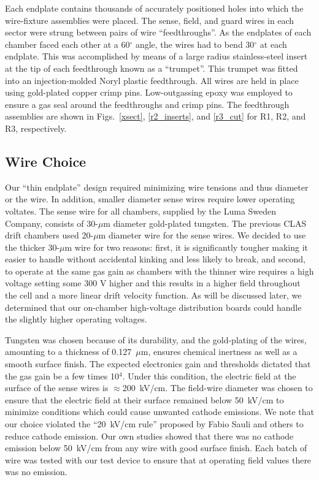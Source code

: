 Each endplate contains thousands of accurately positioned holes into which the 
wire-fixture assemblies were placed.  The sense, field, and guard wires in each 
sector were strung between pairs of wire ``feedthroughs''.  As the endplates of 
each chamber faced each other at a 60$^{\circ}$ angle, the wires had to bend 
30$^{\circ}$ at each endplate.  This was accomplished by means of a large radius 
stainless-steel insert at the tip of each feedthrough known as a ``trumpet''.
This trumpet was fitted into an injection-molded Noryl plastic feedthrough.  
All wires are held in place using gold-plated copper crimp pins.  
Low-outgassing epoxy was employed to 
ensure a gas seal around the feedthroughs and crimp pins.  The feedthrough assemblies
are shown in Figs.~\ref{xsect}, \ref{r2_inserts}, and \ref{r3_cut} for R1, R2, 
and R3, respectively.

\subsection{Wire Choice}
\hskip 0.15in

Our ``thin endplate'' design required minimizing wire tensions and
thus diameter or the wire.  In addition, smaller diameter sense wires
require lower operating voltates.
The sense wire for all chambers, supplied by the Luma
Sweden Company, consists of 30-$\mu$m diameter gold-plated tungsten.  
The previous CLAS drift chambers used 20-$\mu$m diameter wire for the
sense wires.  We decided to use the thicker 30-$\mu$m wire for two 
reasons: first, it is significantly tougher making it easier to handle without
accidental kinking and less likely to break, and second, to operate at the same 
gas gain as chambers with the thinner wire requires a high voltage setting 
some 300 V higher and this results in a higher field throughout the cell
and a more linear drift velocity function.  As will be discussed later,
we determined that our on-chamber high-voltage distribution boards could
handle the slightly higher operating voltages.

Tungsten was chosen because of its durability, 
and the gold-plating of the wires, amounting to a thickness of 0.127~$\mu$m, 
ensures chemical inertness as well as a smooth surface finish.  The expected 
electronics gain and thresholds dictated that the gas gain be a few times 
10$^4$.  Under this condition, the electric field at the surface of the sense 
wires is $\approx$200~kV/cm.  The field-wire diameter was chosen to ensure 
that the electric field at their surface remained below 50~kV/cm to minimize 
conditions which could cause unwanted cathode emissions.  We note that
our choice violated the ``20~kV/cm rule'' proposed by Fabio Sauli and others
to reduce cathode emission.  Our own studies showed that there was no cathode
emission below 50~kV/cm from any wire with good surface finish.  Each batch
of wire was tested with our test device to ensure that at operating field 
values there was no emission.  

